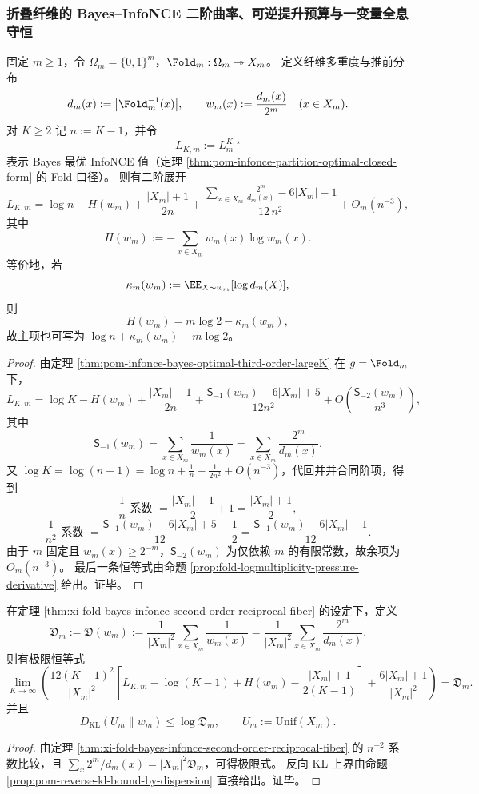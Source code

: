 \subsubsection{折叠纤维的 Bayes--InfoNCE 二阶曲率、可逆提升预算与一变量全息守恒}\label{subsubsec:xi-time-protocol-conclusions-part46}

\begin{theorem}\label{thm:xi-fold-bayes-infonce-second-order-reciprocal-fiber}
固定 \(m\ge 1\)，令 \(\Omega_m=\{0,1\}^m\)，\(\Fold_m:\Omega_m\twoheadrightarrow X_m\)。
定义纤维多重度与推前分布
\[
d_m(x):=\bigl|\Fold_m^{-1}(x)\bigr|,
\qquad
w_m(x):=\frac{d_m(x)}{2^m}\quad(x\in X_m).
\]
对 \(K\ge 2\) 记 \(n:=K-1\)，并令
\[
L_{K,m}:=L_m^{K,\star}
\]
表示 Bayes 最优 InfoNCE 值（定理 \ref{thm:pom-infonce-partition-optimal-closed-form} 的 Fold 口径）。
则有二阶展开
\[
L_{K,m}
=\log n-H(w_m)
+\frac{|X_m|+1}{2n}
+\frac{\displaystyle \sum_{x\in X_m}\frac{2^m}{d_m(x)}-6|X_m|-1}{12\,n^2}
+O_m(n^{-3}),
\]
其中
\[
H(w_m):=-\sum_{x\in X_m}w_m(x)\log w_m(x).
\]
等价地，若
\[
\kappa_m(w_m):=\EE_{X\sim w_m}[\log d_m(X)],
\]
则
\[
H(w_m)=m\log 2-\kappa_m(w_m),
\]
故主项也可写为 \(\log n+\kappa_m(w_m)-m\log 2\)。
\end{theorem}
\begin{proof}
由定理 \ref{thm:pom-infonce-bayes-optimal-third-order-largeK} 在 \(g=\Fold_m\) 下，
\[
L_{K,m}
=\log K-H(w_m)
+\frac{|X_m|-1}{2n}
+\frac{\mathsf S_{-1}(w_m)-6|X_m|+5}{12n^2}
+O\!\left(\frac{\mathsf S_{-2}(w_m)}{n^3}\right),
\]
其中
\[
\mathsf S_{-1}(w_m)=\sum_{x\in X_m}\frac{1}{w_m(x)}
=\sum_{x\in X_m}\frac{2^m}{d_m(x)}.
\]
又 \(\log K=\log(n+1)=\log n+\frac1n-\frac{1}{2n^2}+O(n^{-3})\)，代回并并合同阶项，得到
\[
\frac1n\text{ 系数 }=\frac{|X_m|-1}{2}+1=\frac{|X_m|+1}{2},
\]
\[
\frac1{n^2}\text{ 系数 }=\frac{\mathsf S_{-1}(w_m)-6|X_m|+5}{12}-\frac12
=\frac{\mathsf S_{-1}(w_m)-6|X_m|-1}{12}.
\]
由于 \(m\) 固定且 \(w_m(x)\ge 2^{-m}\)，\(\mathsf S_{-2}(w_m)\) 为仅依赖 \(m\) 的有限常数，故余项为 \(O_m(n^{-3})\)。
最后一条恒等式由命题 \ref{prop:fold-logmultiplicity-pressure-derivative} 给出。证毕。
\end{proof}

\begin{corollary}[二阶曲率识别离散度指数与反向 KL 证书]\label{cor:xi-fold-infonce-second-order-curvature-dispersion}
在定理 \ref{thm:xi-fold-bayes-infonce-second-order-reciprocal-fiber} 的设定下，定义
\[
\mathfrak D_m:=\mathfrak D(w_m)
:=\frac{1}{|X_m|^2}\sum_{x\in X_m}\frac{1}{w_m(x)}
=\frac{1}{|X_m|^2}\sum_{x\in X_m}\frac{2^m}{d_m(x)}.
\]
则有极限恒等式
\[
\lim_{K\to\infty}\left(
\frac{12(K-1)^2}{|X_m|^2}
\left[
L_{K,m}-\log(K-1)+H(w_m)-\frac{|X_m|+1}{2(K-1)}
\right]
+\frac{6|X_m|+1}{|X_m|^2}
\right)=\mathfrak D_m.
\]
并且
\[
D_{\mathrm{KL}}(U_m\|w_m)\le \log \mathfrak D_m,
\qquad
U_m:=\mathrm{Unif}(X_m).
\]
\end{corollary}
\begin{proof}
由定理 \ref{thm:xi-fold-bayes-infonce-second-order-reciprocal-fiber} 的 \(n^{-2}\) 系数比较，且
\(
\sum_x 2^m/d_m(x)=|X_m|^2\mathfrak D_m
\)，可得极限式。
反向 KL 上界由命题 \ref{prop:pom-reverse-kl-bound-by-dispersion} 直接给出。证毕。
\end{proof}

